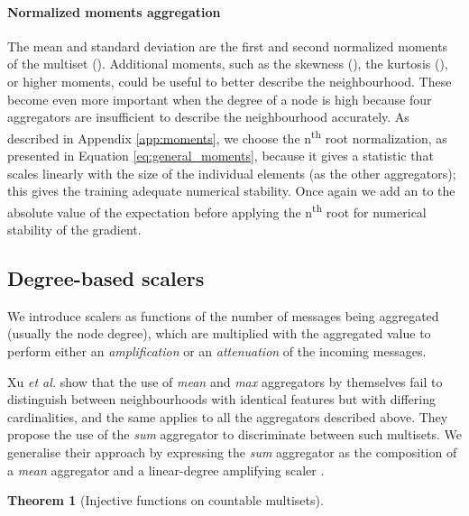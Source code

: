 \documentclass{article}
\newtheorem{theorem}{Theorem}
\begin{document}
\paragraph{Normalized moments aggregation }
The mean and standard deviation are the first and second normalized moments of the multiset (). Additional moments, such as the skewness (), the kurtosis (), or higher moments, could be useful to better describe the neighbourhood. These become even more important when the degree of a node is high because four aggregators are insufficient to describe the neighbourhood accurately. As described in Appendix \ref{app:moments}, we choose the n\textsuperscript{th} root normalization, as presented in Equation \ref{eq:general_moments}, because it gives a statistic that scales linearly with the size of the individual elements (as the other aggregators); this gives the training adequate numerical stability. Once again we add an  to the absolute value of the expectation before applying the n\textsuperscript{th} root for numerical stability of the gradient.




\subsection{Degree-based scalers}
\label{sec:scalers}

We introduce scalers as functions of the number of messages being aggregated (usually the node degree), which are multiplied with the aggregated value to perform either an \emph{amplification} or an \emph{attenuation} of the incoming messages.

Xu \emph{et al.} \cite{xu2018gin} show that the use of \textit{mean} and \textit{max} aggregators by themselves fail to distinguish between neighbourhoods with identical features but with differing cardinalities, and the same applies to all the aggregators described above. They propose the use of the \textit{sum} aggregator to discriminate between such multisets. We generalise their approach by expressing the \textit{sum} aggregator as the composition of a \textit{mean} aggregator and a linear-degree amplifying scaler . 


\vspace{3pt}

\begin{theorem}[Injective functions on countable multisets]
    \label{theorem:2}
\end{theorem}
\end{document}
